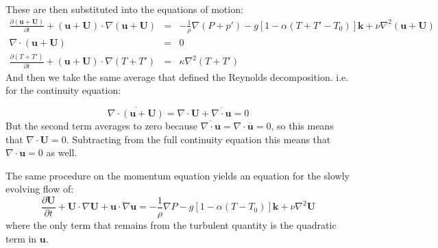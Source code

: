 \documentclass[11pt]{article}
\begin{document}
These are then substituted into the equations of motion:
\begin{eqnarray*}
     \frac{\partial (\mathbf{u}+\mathbf{U})}{\partial t} + (\mathbf{u}+\mathbf{U})\cdot \nabla (\mathbf{u}+\mathbf{U}) & = & -\frac{1}{\rho} \nabla (P+p') - g \left[  1 - \alpha(T+T'-T_0)\right]\mathbf{k} + \nu \nabla^2(\mathbf{u}+\mathbf{U})\\
     \nabla\cdot\mathbf{(\mathbf{u}+\mathbf{U})} & = & 0\\
     \frac{\partial (T+T')}{\partial t} + \mathbf{(\mathbf{u}+\mathbf{U})}\cdot\nabla (T+T') & = & \kappa \nabla^2 (T+T')
 \end{eqnarray*}
And then we take the same average that defined the Reynolds decomposition.  i.e. for the continuity equation:

\begin{equation}
    \overline{\nabla\cdot\mathbf{(\mathbf{u}+\mathbf{U})}} = \nabla\cdot \mathbf{U} + \overline{\nabla\cdot \mathbf{u}}  = 0
\end{equation}
But the second term averages to zero because $\overline{\nabla\cdot \mathbf{u}} = \nabla\cdot \overline{\mathbf{u}} = 0$, so this means that $\nabla\cdot\mathbf{U} = 0$.  Subtracting from the full continuity equation this means that $\nabla\cdot \mathbf{u} = 0$ as well.  

The same procedure on the momentum equation yields an equation for the slowly evolving flow of:
\begin{equation}
    \frac{\partial \mathbf{U}}{\partial t} + \mathbf{U}\cdot \nabla \mathbf{U} + \overline{\mathbf{u} \cdot \nabla \mathbf{u}} = -\frac{1}{\rho} \nabla P - g \left[ 1 - \alpha \left( T-T_0 \right) \right] \mathbf{k} + \nu\nabla^2 \mathbf{U}
\end{equation}
where the only term that remains from the turbulent quantity is the quadratic term in $\mathbf{u}$.  
\end{document}
